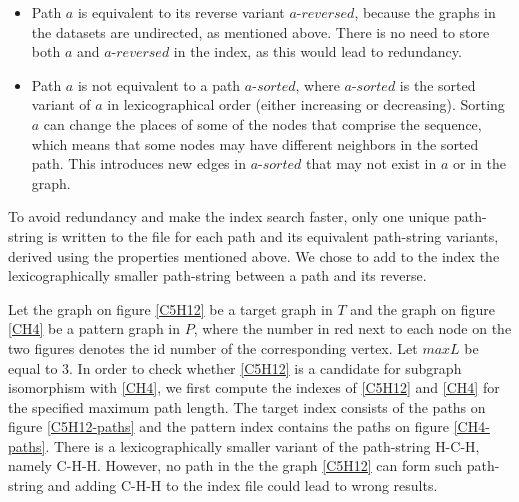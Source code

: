 \documentclass{l4proj}
\theoremstyle{definition}
\begin{document}
\begin{itemize}
\item Path $a$ is equivalent to its reverse variant $a$-$reversed$, because the graphs in the datasets are undirected, as mentioned above. There is no need to store both $a$ and $a$-$reversed$ in the index, as this would lead to redundancy.
\item Path $a$ is not equivalent to a path $a$-$sorted$, where $a$-$sorted$ is the sorted variant of $a$ in lexicographical order (either increasing or decreasing). Sorting $a$ can change the places of some of the nodes that comprise the sequence, which means that some nodes may have different neighbors in the sorted path. This introduces new edges in $a$-$sorted$ that may not exist in $a$ or in the graph.
\end{itemize}
To avoid redundancy and make the index search faster, only one unique path-string is written to the file for each path and its equivalent path-string variants, derived using the properties mentioned above. We chose to add to the index the lexicographically smaller path-string between a path and its reverse. \par
Let the graph on figure \ref{C5H12} be a target graph in $T$ and the graph on figure \ref{CH4} be a pattern graph in $P$, where the number in red next to each node on the two figures denotes the id number of the corresponding vertex. Let $maxL$ be equal to 3. In order to check whether \ref{C5H12} is a candidate for subgraph isomorphism with \ref{CH4}, we first compute the indexes of \ref{C5H12} and \ref{CH4} for the specified maximum path length. The target index consists of the paths on figure \ref{C5H12-paths} and the pattern index contains the paths on figure \ref{CH4-paths}. There is a lexicographically smaller variant of the path-string \textrm{H-C-H}, namely \textrm{C-H-H}. However, no path in the the graph \ref{C5H12} can form such path-string and adding \textrm{C-H-H} to the index file could lead to wrong results.\par
\end{document}
